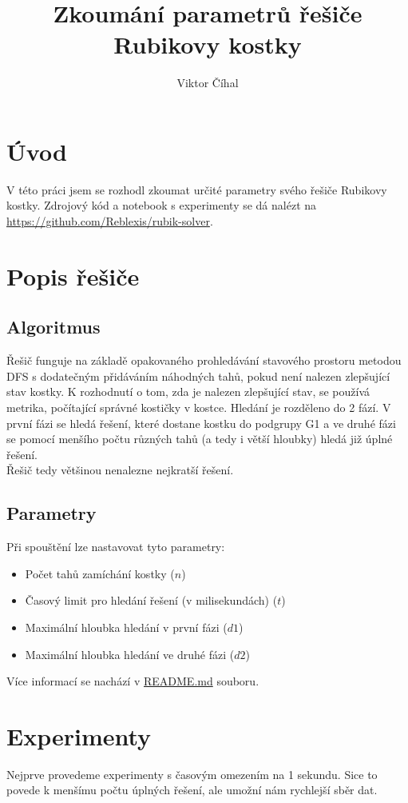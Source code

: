 \documentclass{article}
\title{Zkoumání parametrů řešiče Rubikovy kostky}
\author{Viktor Číhal}
\date{}
\begin{document}
\maketitle
\section*{Úvod}
V této práci jsem se rozhodl zkoumat určité parametry svého řešiče Rubikovy kostky.
Zdrojový kód a notebook s experimenty se dá nalézt na \url{https://github.com/Reblexis/rubik-solver}.

\section*{Popis řešiče}
\subsection*{Algoritmus}
Řešič funguje na základě opakovaného prohledávání stavového prostoru metodou DFS
s dodatečným přidáváním náhodných tahů, pokud není nalezen zlepšující stav kostky.
K rozhodnutí o tom, zda je nalezen zlepšující stav, se používá metrika, počítající
správné kostičky v kostce. Hledání je rozděleno do 2 fází. V první fázi se hledá
řešení, které dostane kostku do podgrupy G1 a ve druhé fázi se pomocí menšího počtu
různých tahů (a tedy i větší hloubky) hledá již úplné řešení.\\
Řešič tedy většinou nenalezne nejkratší řešení.

\subsection*{Parametry}
Při spouštění lze nastavovat tyto parametry:
\begin{itemize}
    \item Počet tahů zamíchání kostky ($n$)
    \item Časový limit pro hledání řešení (v milisekundách) ($t$)
    \item Maximální hloubka hledání v první fázi ($d1$)
    \item Maximální hloubka hledání ve druhé fázi ($d2$)
\end{itemize}

Více informací se nachází v \href{https://github.com/Reblexis/rubik-solver/blob/main/README.md}{README.md} souboru.

\section*{Experimenty}
Nejprve provedeme experimenty s časovým omezením na 1 sekundu. Sice to povede k menšímu počtu úplných
řešení, ale umožní nám rychlejší sběr dat. 
\end{document}
